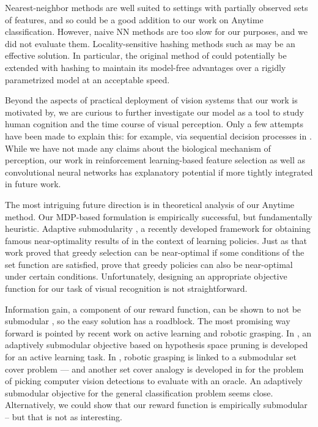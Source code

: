 Nearest-neighbor methods are well suited to settings with partially observed sets of features, and so could be a good addition to our work on Anytime classification.
However, naive NN methods are too slow for our purposes, and we did not evaluate them.
Locality-sensitive hashing methods such as \cite{Kulis2009b} may be an effective solution.
In particular, the original method of \cite{Gao-NIPS-2011} could potentially be extended with hashing to maintain its model-free advantages over a rigidly parametrized model at an acceptable speed.

Beyond the aspects of practical deployment of vision systems that our work is motivated by, we are curious to further investigate our model as a tool to study human cognition and the time course of visual perception.
Only a few attempts have been made to explain this: for example, via sequential decision processes in \textcite{Hegde-Neuro-2008}.
While we have not made any claims about the biological mechanism of perception, our work in reinforcement learning-based feature selection as well as convolutional neural networks has explanatory potential if more tightly integrated in future work.

The most intriguing future direction is in theoretical analysis of our Anytime method.
Our MDP-based formulation is empirically successful, but fundamentally heuristic.
Adaptive submodularity \parencite{Golovin-and-Krause-2010-JAIR}, a recently developed framework for obtaining famous near-optimality results of \cite{Nemhauser1978} in the context of learning policies.
Just as that work proved that greedy selection can be near-optimal if some conditions of the set function are satisfied, \cite{Golovin-and-Krause-2010-JAIR} prove that greedy policies can also be near-optimal under certain conditions.
Unfortunately, designing an appropriate objective function for our task of visual recognition is not straightforward.

Information gain, a component of our reward function, can be shown to not be submodular \cite{Krause-UAI-2005}, so the easy solution has a roadblock.
The most promising way forward is pointed by recent work on active learning and robotic grasping.
In \cite{Golovin-2010}, an adaptively submodular objective based on hypothesis space pruning is developed for an active learning task.
In \cite{Javdani2012}, robotic grasping is linked to a submodular set cover problem --- and another set cover analogy is developed in \cite{Chen-2014-ICML} for the problem of picking computer vision detections to evaluate with an oracle.
An adaptively submodular objective for the general classification problem seems close.
Alternatively, we could show that our reward function is empirically submodular -- but that is not as interesting.

